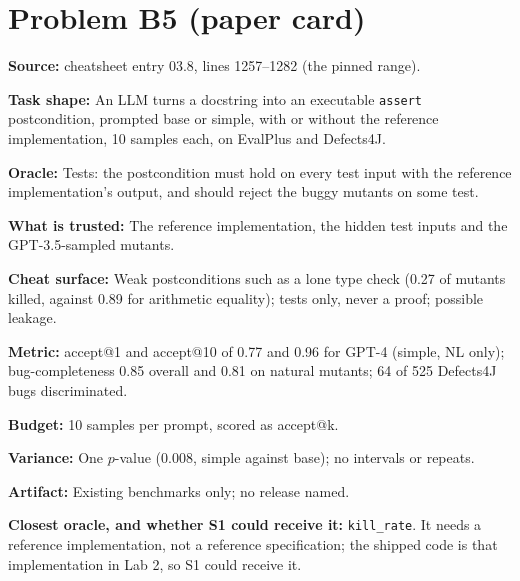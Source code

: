\documentclass[11pt]{article}
\begin{document}
\section*{Problem B5 (paper card)}\label{ans:B5}
\begin{answer}
\textbf{Source:} cheatsheet entry 03.8, lines 1257--1282 (the pinned range).

\textbf{Task shape:} An LLM turns a docstring into an executable
\texttt{assert} postcondition, prompted base or simple, with or without the
reference implementation, 10 samples each, on EvalPlus and Defects4J.

\textbf{Oracle:} Tests: the postcondition must hold on every test input with
the reference implementation's output, and should reject the buggy mutants on
some test.

\textbf{What is trusted:} The reference implementation, the hidden test inputs
and the GPT-3.5-sampled mutants.

\textbf{Cheat surface:} Weak postconditions such as a lone type check (0.27 of
mutants killed, against 0.89 for arithmetic equality); tests only, never a
proof; possible leakage.

\textbf{Metric:} accept@1 and accept@10 of 0.77 and 0.96 for GPT-4 (simple,
NL only); bug-completeness 0.85 overall and 0.81 on natural mutants; 64 of 525
Defects4J bugs discriminated.

\textbf{Budget:} 10 samples per prompt, scored as accept@k.

\textbf{Variance:} One $p$-value (0.008, simple against base); no intervals or
repeats.

\textbf{Artifact:} Existing benchmarks only; no release named.

\textbf{Closest oracle, and whether S1 could receive it:} \texttt{kill\_rate}.
It needs a reference implementation, not a reference specification; the
shipped code is that implementation in Lab 2, so S1 could receive it.
\end{answer}
\end{document}
